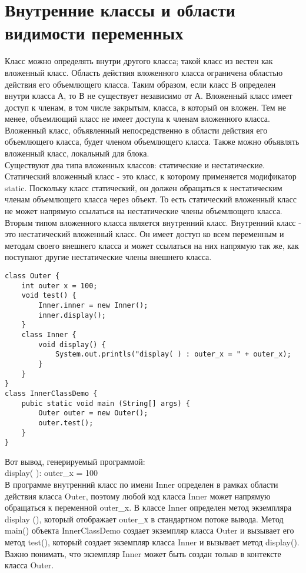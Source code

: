 \section{Внутренние классы и области видимости переменных}
Класс можно определять внутри другого класса; такой класс из вестен как вложенный класс. Область действия вложенного класса ограничена областью действия его объемлющего класса. Таким образом, если класс В определен внутри класса А, то В не существует независимо от А. Вложенный класс имеет доступ к членам, в том числе закрытым, класса, в который он вложен. Тем не менее, объемлющий класс не имеет доступа к членам вложенного класса. Вложенный класс, объявленный непосредственно в области действия его объемлющего класса, будет членом объемлющего класса. Также можно объявлять вложенный класс, локальный для блока. \\
Существуют два типа вложенных классов: статические и нестатические. Статический вложенный класс - это класс, к которому применяется модификатор static. Поскольку класс статический, он должен обращаться к нестатическим членам объемлющего класса через объект. То есть статический вложенный класс не может напрямую ссылаться на нестатические члены объемлющего класса. Вторым типом вложенного класса является внутренний класс. Внутренний класс - это нестатический вложенный класс. Он имеет доступ ко всем переменным и методам своего внешнего класса и может ссылаться на них напрямую так же, как поступают другие нестатические члены внешнего класса. 
\begin{lstlisting}
class Outer {
    int outer x = 100;
    void test() {
        Inner.inner = new Inner();
        inner.display();
    }
    class Inner {
        void display() {
            System.out.printls("display( ) : outer_x = " + outer_x);
        }
    }
}
class InnerClassDemo {
    pubic static void main (String[] args) {
        Outer outer = new Outer();
        outer.test();
    }
}
\end{lstlisting}
Вот вывод, генерируемый программой: \\
display( ): outer\_x = 100 \\
В программе внутренний класс по имени Inner определен в рамках области действия класса Outer, поэтому любой код класса Inner может напрямую обращаться к переменной outer\_x. В классе Inner определен метод экземпляра display (), который отображает outer\_х в стандартном потоке вывода. Метод main() объекта InnerClassDemo создает экземпляр класса Outer и вызывает его метод test(), который создает экземпляр класса Inner и вызывает метод display(). Важно понимать, что экземпляр Inner может быть создан только в контексте класса Outer. \\

